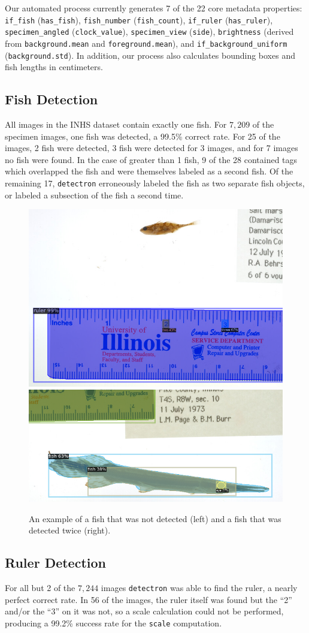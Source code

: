 \documentclass[conference]{IEEEtran}
\begin{document}
Our automated process currently generates 7 of the 22 core metadata properties: \verb|if_fish| (\verb|has_fish|), \verb|fish_number| (\verb|fish_count|), \verb|if_ruler| (\verb|has_ruler|), \verb|specimen_angled| (\verb|clock_value|), \verb|specimen_view| (\verb|side|), \verb|brightness| (derived from \verb|background.mean| and \verb|foreground.mean|), and \verb|if_background_uniform| (\verb|background.std|). In addition, our process also calculates bounding boxes and fish lengths in centimeters.

\subsection{Fish Detection}
All images in the INHS dataset contain exactly one fish. For \(7,209\) of the specimen images, one fish was detected, a 99.5\% correct rate.
For 25 of the images, 2 fish were detected, 3 fish were detected for 3 images, and for 7 images no fish were found. In the case of greater than 1 fish, 9 of the 28 contained tags which overlapped the fish and were themselves labeled as a second fish. Of the remaining 17, \verb|detectron| erroneously labeled the fish as two separate fish objects, or labeled a subsection of the fish a second time.

\begin{figure}[H]
  \centering
  \includegraphics[width=0.49\linewidth]{images/none1}
  \includegraphics[width=0.49\linewidth]{images/double1}
  \caption{An example of a fish that was not detected (left) and a fish that was detected twice (right).}
\end{figure}

\subsection{Ruler Detection}
For all but 2 of the \(7,244\) images \verb|detectron| was able to find the ruler, a nearly perfect correct rate.
In 56 of the images, the ruler itself was found but the ``2'' and/or the ``3'' on it was not, so a scale calculation could not be performed, producing a 99.2\% success rate for
the \verb|scale| computation.
\end{document}
